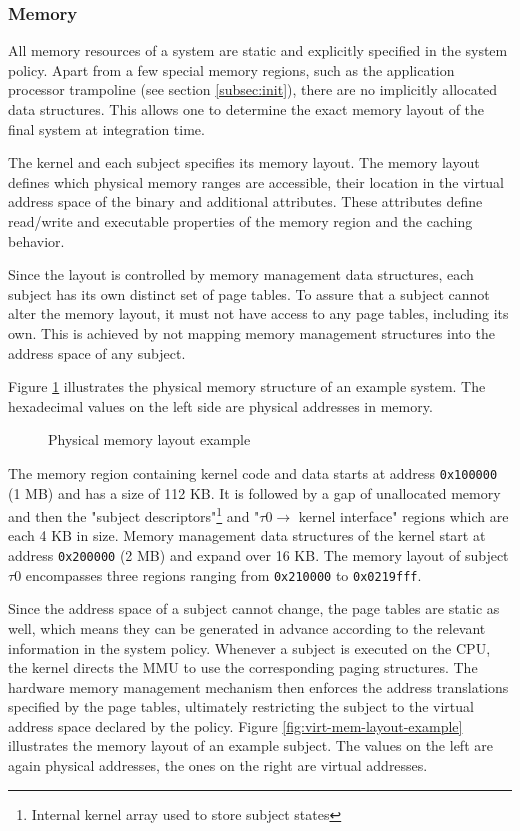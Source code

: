 \subsubsection{Memory}
All memory resources of a system are static and explicitly specified in the
system policy. Apart from a few special memory regions, such as the application
processor trampoline (see section \ref{subsec:init}), there are no implicitly
allocated data structures. This allows one to determine the exact memory layout
of the final system at integration time.

The kernel and each subject specifies its memory layout. The memory layout
defines which physical memory ranges are accessible, their location in the
virtual address space of the binary and additional attributes. These attributes
define read/write and executable properties of the memory region and the caching
behavior.

Since the layout is controlled by memory management data structures,
each subject has its own distinct set of page tables. To assure that a subject
cannot alter the memory layout, it must not have access to any page tables,
including its own. This is achieved by not mapping memory management structures
into the address space of any subject.

Figure \ref{fig:phys-mem-layout-example} illustrates the physical memory
structure of an example system. The hexadecimal values on the left side are
physical addresses in memory.

\begin{figure}[h]
	\centering
	
	\caption{Physical memory layout example}
	\label{fig:phys-mem-layout-example}
\end{figure}

The memory region containing kernel code and data starts at address
\texttt{0x100000} (1 MB) and has a size of 112 KB. It is followed by a gap of
unallocated memory and then the "subject descriptors"\footnote{Internal kernel
array used to store subject states} and "$\tau0\rightarrow$ kernel interface"
regions which are each 4 KB in size.  Memory management data structures of the
kernel start at address \texttt{0x200000} (2 MB) and expand over 16 KB. The
memory layout of subject $\tau0$ encompasses three regions ranging from
\texttt{0x210000} to \texttt{0x0219fff}.

Since the address space of a subject cannot change, the page tables are static
as well, which means they can be generated in advance according to the relevant
information in the system policy. Whenever a subject is executed on the CPU, the
kernel directs the MMU to use the corresponding paging structures. The hardware
memory management mechanism then enforces the address translations specified by
the page tables, ultimately restricting the subject to the virtual address space
declared by the policy. Figure \ref{fig:virt-mem-layout-example} illustrates the
memory layout of an example subject. The values on the left are again physical
addresses, the ones on the right are virtual addresses.

